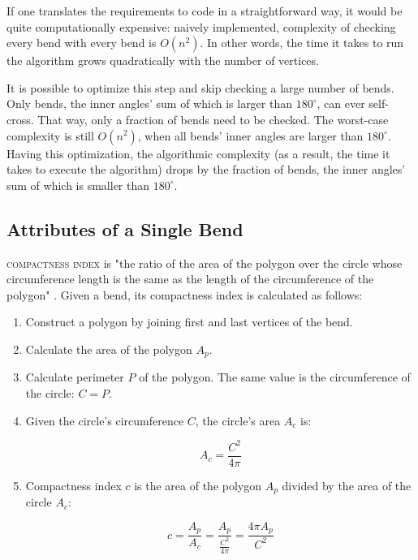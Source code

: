 \documentclass[a4paper]{article}
\begin{document}
If one translates the requirements to code in a straightforward way, it would
be quite computationally expensive: naively implemented, complexity of checking
every bend with every bend is $O(n^2)$. In other words, the time it takes to
run the algorithm grows quadratically with the number of vertices.

It is possible to optimize this step and skip checking a large number of bends.
Only bends, the inner angles' sum of which is larger than $180^\circ$, can ever
self-cross. That way, only a fraction of bends need to be checked. The
worst-case complexity is still $O(n^2)$, when all bends' inner angles are
larger than $180^\circ$. Having this optimization, the algorithmic complexity
(as a result, the time it takes to execute the algorithm) drops by the
fraction of bends, the inner angles' sum of which is smaller than $180^\circ$.

\subsection{Attributes of a Single Bend}

\textsc{compactness index} is "the ratio of the area of the polygon over the
circle whose circumference length is the same as the length of the
circumference of the polygon" \cite{wang1998line}. Given a bend, its
compactness index is calculated as follows:

\begin{enumerate}

  \item Construct a polygon by joining first and last vertices of the bend.

  \item Calculate the area of the polygon $A_{p}$.

  \item Calculate perimeter $P$ of the polygon. The same value is the
      circumference of the circle: $C = P$.

    \item Given the circle's circumference $C$, the circle's area $A_{c}$ is:

    \[
      A_c = \frac{C^2}{4\pi}
    \]

  \item Compactness index $c$ is the area of the polygon $A_p$ divided by the
      area of the circle $A_c$:

    \[
      c = \frac{A_p}{A_c} =
          \frac{A_p}{ \frac{C^2}{4\pi} } =
          \frac{4\pi A_p}{C^2}
    \]

\end{enumerate}
\end{document}
